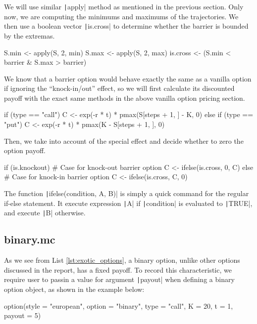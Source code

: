 We will use similar \texttt|apply| method as mentioned in the previous section. Only now, we are computing the minimums and maximums of the trajectories. We then use a boolean vector \texttt|is.cross| to determine whether the barrier is bounded by the extremas.

\begin{Rminted}
S.min <- apply(S, 2, min)
S.max <- apply(S, 2, max)
is.cross <- (S.min < barrier & S.max > barrier)
\end{Rminted}

We know that a barrier option would behave exactly the same as a vanilla option if ignoring the ``knock-in/out'' effect, so we will first calculate its discounted payoff with the exact same methods in the above vanilla option pricing section.

\begin{Rminted}
if (type == "call") {
    C <- exp(-r * t) * pmax(S[steps + 1, ] - K, 0)
} else if (type == "put") {
    C <- exp(-r * t) * pmax(K - S[steps + 1, ], 0)
}
\end{Rminted}

Then, we take into account of the special effect and decide whether to zero the option payoff.

\begin{Rminted}
if (is.knockout) { # Case for knock-out barrier option
    C <- ifelse(is.cross, 0, C)
} else { # Case for knock-in barrier option
    C <- ifelse(is.cross, C, 0)
}
\end{Rminted}

The function \texttt|ifelse(condition, A, B)| is simply a quick command for the regular if-else statement. It execute expression \texttt|A| if \texttt|condition| is evaluated to \texttt|TRUE|, and execute \texttt|B| otherwise.

\subsection{binary.mc}

As we see from List \ref{lst:exotic_options}, a binary option, unlike other options discussed in the report, has a fixed payoff. To record this characteristic, we require user to passin a value for argument \texttt|payout| when defining a binary option object, as shown in the example below:

\begin{Rminted}
option(style = "european", option = "binary", type = "call", K = 20, t = 1, payout = 5)
\end{Rminted}

